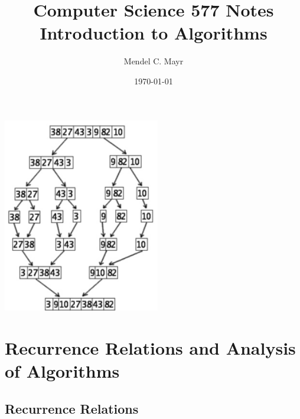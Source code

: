\documentclass{article}
\title{Computer Science 577 Notes \\ Introduction to Algorithms}
\author{Mendel C. Mayr}
\date{\today}
\begin{document}
	\maketitle
	\vspace{10pt}
	\begin{center}
		\includegraphics[width = 2.7in]{mergesort.png}
		\end{center}
	\vspace{12pt}
	\tableofcontents
	\clearpage

	\section{Recurrence Relations and Analysis of Algorithms}
		\subsection{Recurrence Relations}
\end{document}
